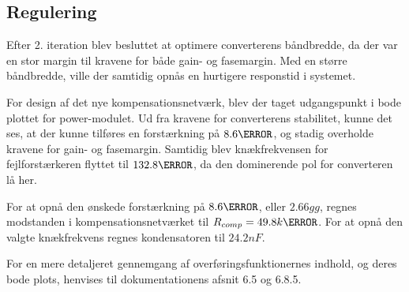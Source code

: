 
\subsection{Regulering}
Efter 2. iteration blev besluttet at optimere converterens båndbredde, da der var en stor margin til kravene for både gain- og fasemargin. Med en større båndbredde, ville der samtidig opnås en hurtigere responstid i systemet. 

For design af det nye kompensationsnetværk, blev der taget udgangspunkt i bode plottet for power-modulet. Ud fra kravene for converterens stabilitet, kunne det ses, at der kunne tilføres en forstærkning på $8.6\decibel$, og stadig overholde kravene for gain- og fasemargin. Samtidig blev knækfrekvensen for fejlforstærkeren flyttet til $132.8\hertz$, da den dominerende pol for converteren lå her. 

For at opnå den ønskede forstærkning på $8.6\decibel$, eller $2.66gg$, regnes modstanden i kompensationsnetværket til $R_{comp} = 49.8k\ohm$. For at opnå den valgte knækfrekvens regnes kondensatoren til $24.2nF$. 

For en mere detaljeret gennemgang af overføringsfunktionernes indhold, og deres bode plots, henvises til dokumentationens afsnit 6.5 og 6.8.5.
